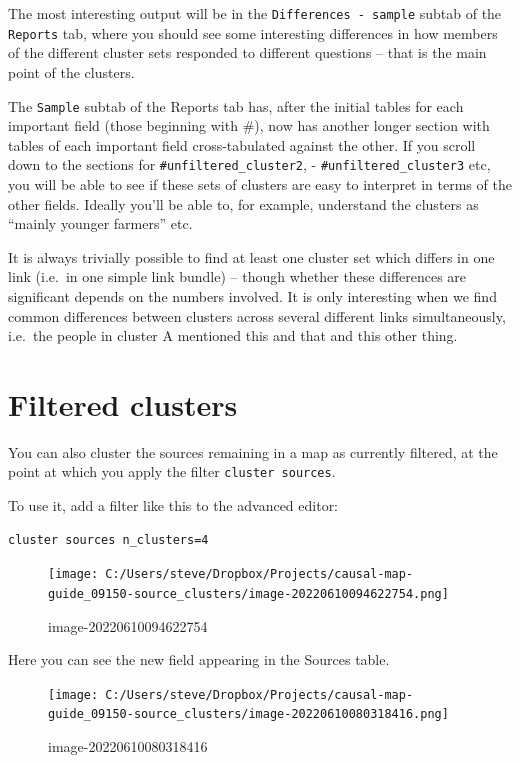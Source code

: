 \documentclass[
]{book}
\begin{document}
The most interesting output will be in the \texttt{Differences\ -\ sample} subtab of the \texttt{Reports} tab, where you should see some interesting differences in how members of the different cluster sets responded to different questions -- that is the main point of the clusters.

The \texttt{Sample} subtab of the Reports tab has, after the initial tables for each important field (those beginning with \#), now has another longer section with tables of each important field cross-tabulated against the other. If you scroll down to the sections for \texttt{\#unfiltered\_cluster2}, - \texttt{\#unfiltered\_cluster3} etc, you will be able to see if these sets of clusters are easy to interpret in terms of the other fields. Ideally you'll be able to, for example, understand the clusters as ``mainly younger farmers'' etc.

It is always trivially possible to find at least one cluster set which differs in one link (i.e.~in one simple link bundle) -- though whether these differences are significant depends on the numbers involved. It is only interesting when we find common differences between clusters across several different links simultaneously, i.e.~the people in cluster A mentioned this and that and this other thing.

\hypertarget{filtered-clusters}{%
\section{Filtered clusters}\label{filtered-clusters}}

You can also cluster the sources remaining in a map as currently filtered, at the point at which you apply the filter \texttt{cluster\ sources}.

To use it, add a filter like this to the advanced editor:

\begin{verbatim}
cluster sources n_clusters=4
\end{verbatim}

\begin{figure}
\centering
\texttt{[image: C:/Users/steve/Dropbox/Projects/causal-map-guide\_09150-source\_clusters/image-20220610094622754.png]}
\caption{image-20220610094622754}
\end{figure}

Here you can see the new field appearing in the Sources table.

\begin{figure}
\centering
\texttt{[image: C:/Users/steve/Dropbox/Projects/causal-map-guide\_09150-source\_clusters/image-20220610080318416.png]}
\caption{image-20220610080318416}
\end{figure}
\end{document}
